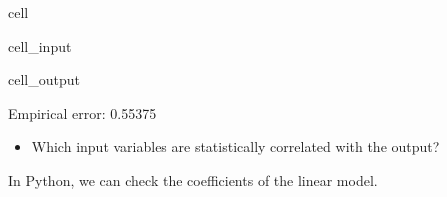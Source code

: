 \documentclass[letterpaper,10pt,english]{jupyterBook}
\begin{document}
\begin{sphinxuseclass}{cell}\begin{sphinxVerbatimInput}

\begin{sphinxuseclass}{cell_input}
\begin{sphinxVerbatim}[commandchars=\\\{\}]
 

  
 
  

   
\end{sphinxVerbatim}

\end{sphinxuseclass}\end{sphinxVerbatimInput}
\begin{sphinxVerbatimOutput}

\begin{sphinxuseclass}{cell_output}
\begin{sphinxVerbatim}[commandchars=\\\{\}]
Empirical error: 0.55375
\end{sphinxVerbatim}

\end{sphinxuseclass}\end{sphinxVerbatimOutput}

\end{sphinxuseclass}\begin{itemize}
\item {} 
\sphinxAtStartPar
Which input variables are statistically correlated with the output?

\end{itemize}

\sphinxAtStartPar
In Python, we can check the coefficients of the linear model.
\end{document}
